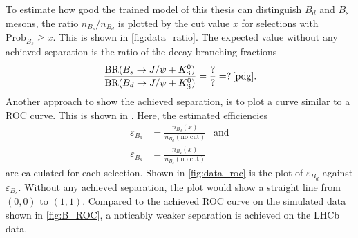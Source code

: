 To estimate how good the trained model of this thesis can distinguish $B_d$ and $B_s$ mesons, the ratio $n_{B_s}/n_{B_d}$ is plotted by the cut value $x$ for selections with $\text{Prob}_{B_s} \geq x$. 
This is shown in \autoref{fig:data_ratio}.
The expected value without any achieved separation is the ratio of the decay branching fractions
\begin{equation*}
    \frac{\text{BR}(B_s \rightarrow J/\psi + K^0_\text{S})}{\text{BR}(B_d \rightarrow J/\psi + K^0_\text{S})} =
    \frac{?}{?} = ? \, \text{\cite{pdg}.}
\end{equation*}
Another approach to show the achieved separation, is to plot a curve similar to a ROC curve. 
This is shown in .
Here, the estimated efficiencies
\begin{align*}
    \varepsilon_{B_d} &= \frac{n_{B_d}(x)}{n_{B_d}(\text{no cut})} \: \: \text{ and} \\
    \varepsilon_{B_s} &= \frac{n_{B_s}(x)}{n_{B_s}(\text{no cut})}
\end{align*}
are calculated for each selection. Shown in \autoref{fig:data_roc} is the plot of $\varepsilon_{B_d}$ against $\varepsilon_{B_s}$.
Without any achieved separation, the plot would show a straight line from $(0,0)$ to $(1,1)$.
Compared to the achieved ROC curve on the simulated data shown in \autoref{fig:B_ROC}, a noticably weaker separation is achieved on the LHCb data.

